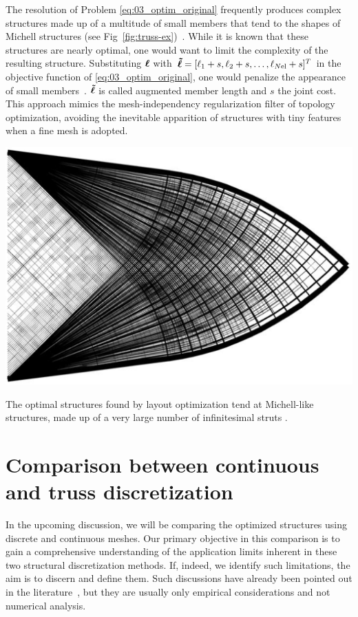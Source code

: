 The resolution of Problem \ref{eq:03_optim_original} frequently produces complex structures made up of a multitude of small members that tend to the shapes of Michell structures (see Fig~\ref{fig:truss-ex})~. While it is known that these structures are nearly optimal, one would want to limit the complexity of the resulting structure. Substituting $\bm{\ell}$ with $\bm{\tilde{\ell}} = [\ell_1 + s, \ell_2 + s, \ldots,\ell_{N\text{el}} + s]^T$ in the objective function of \ref{eq:03_optim_original}, one would penalize the appearance of small members~. $\bm{\tilde{\ell}}$ is called augmented member length and $s$ the joint cost. This approach mimics the mesh-independency regularization filter of topology optimization, avoiding the inevitable apparition of structures with tiny features when a fine mesh is adopted.

\begin{marginfigure}
    \centering
    \includegraphics[width=\linewidth]{figures/03_comparison_TO_TTO/truss-ex.png}
    \caption{The optimal structures found by layout optimization tend at Michell-like structures, made up of a very large number of infinitesimal struts \cite{gilbert_layout_2003}.}
    \label{fig:truss-ex}
\end{marginfigure}

\section{Comparison between continuous and truss discretization} \label{sec:03_comparison}
In the upcoming discussion, we will be comparing the optimized structures using discrete and continuous meshes. Our primary objective in this comparison is to gain a comprehensive understanding of the application limits inherent in these two structural discretization methods. If, indeed, we identify such limitations, the aim is to discern and define them. Such discussions have already been pointed out in the literature~, but they are usually only empirical considerations and not numerical analysis.

